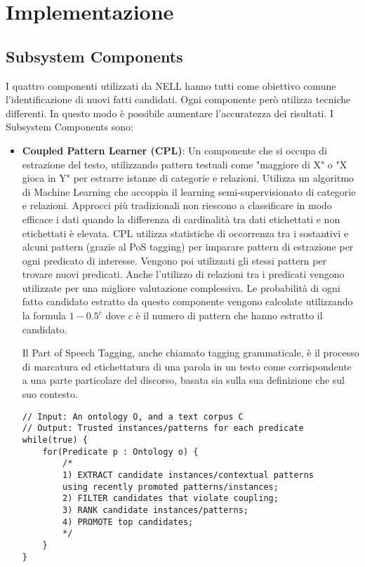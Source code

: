 \section{Implementazione}
\label{impl}
\subsection{Subsystem Components}
I quattro componenti utilizzati da NELL hanno tutti come obiettivo comune l'identificazione di nuovi fatti candidati. Ogni componente però utilizza tecniche differenti. In questo modo è possibile aumentare l'accuratezza dei risultati. I Subsystem Components sono:
\begin{itemize}
	\item \textbf{Coupled Pattern Learner (CPL)}: Un componente che si occupa di estrazione del testo, utilizzando pattern testuali come "maggiore di X" o "X gioca in Y" per estrarre istanze di categorie e relazioni. Utilizza un algoritmo di Machine Learning che accoppia il learning semi-supervisionato di categorie e relazioni. Approcci più tradizionali non riescono a classificare in modo efficace i dati quando la differenza di cardinalità tra dati etichettati e non etichettati è elevata.
	CPL utilizza statistiche di occorrenza tra i sostantivi e alcuni pattern (grazie al PoS tagging) per imparare pattern di estrazione per ogni predicato di interesse. Vengono poi utilizzati gli stessi pattern per trovare nuovi predicati.
	Anche l'utilizzo di relazioni tra i predicati vengono utilizzate per una migliore valutazione complessiva.
	Le probabilità di ogni fatto candidato estratto da questo componente vengono calcolate utilizzando la formula $1 - 0.5^{c}$ dove $c$ è il numero di pattern che hanno estratto il candidato.
	\begin{info}
		Il Part of Speech Tagging, anche chiamato tagging grammaticale, è il processo di marcatura ed etichettatura di una parola in un testo come corrispondente a una parte particolare del discorso, basata sia sulla sua definizione che sul suo contesto\cite{POStagsa85:online}.
	\end{info}
\begin{code}
\begin{verbatim}
// Input: An ontology O, and a text corpus C 
// Output: Trusted instances/patterns for each predicate
while(true) {
	for(Predicate p : Ontology o) {
		/*
		1) EXTRACT candidate instances/contextual patterns 
		using recently promoted patterns/instances;
		2) FILTER candidates that violate coupling;
		3) RANK candidate instances/patterns;
		4) PROMOTE top candidates;
		*/
	}
}
\end{verbatim}
\end{code}
\end{itemize}

\newpage